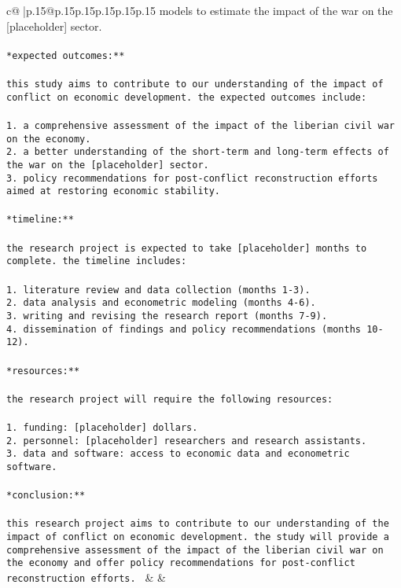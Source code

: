 \documentclass{article}
\begin{document}
{\begin{supertabular}{c@{$\;$}|p{.15\linewidth}@{}p{.15\linewidth}p{.15\linewidth}p{.15\linewidth}p{.15\linewidth}p{.15\linewidth}}
{{{models to estimate the impact of the war on the [placeholder] sector.\\ \tt \\ \tt **expected outcomes:**\\ \tt \\ \tt this study aims to contribute to our understanding of the impact of conflict on economic development. the expected outcomes include:\\ \tt \\ \tt 1. a comprehensive assessment of the impact of the liberian civil war on the economy.\\ \tt 2. a better understanding of the short-term and long-term effects of the war on the [placeholder] sector.\\ \tt 3. policy recommendations for post-conflict reconstruction efforts aimed at restoring economic stability.\\ \tt \\ \tt **timeline:**\\ \tt \\ \tt the research project is expected to take [placeholder] months to complete. the timeline includes:\\ \tt \\ \tt 1. literature review and data collection (months 1-3).\\ \tt 2. data analysis and econometric modeling (months 4-6).\\ \tt 3. writing and revising the research report (months 7-9).\\ \tt 4. dissemination of findings and policy recommendations (months 10-12).\\ \tt \\ \tt **resources:**\\ \tt \\ \tt the research project will require the following resources:\\ \tt \\ \tt 1. funding: [placeholder] dollars.\\ \tt 2. personnel: [placeholder] researchers and research assistants.\\ \tt 3. data and software: access to economic data and econometric software.\\ \tt \\ \tt **conclusion:**\\ \tt \\ \tt this research project aims to contribute to our understanding of the impact of conflict on economic development. the study will provide a comprehensive assessment of the impact of the liberian civil war on the economy and offer policy recommendations for post-conflict reconstruction efforts. 
	  } 
	   } 
	   } 
	 & & \\ 
 


\end{supertabular}}
\end{document}
